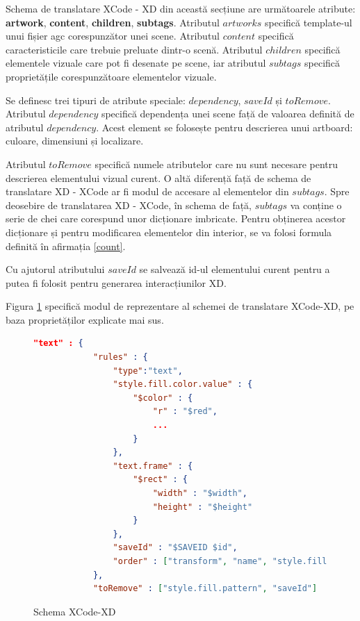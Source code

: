 Schema de translatare XCode - XD din această secțiune are următoarele atribute: \textbf{artwork}, \textbf{content}, \textbf{children}, \textbf{subtags}. Atributul $artworks$ specifică template-ul unui fișier agc corespunzător unei scene. Atributul $content$ specifică caracteristicile care trebuie preluate dintr-o scenă. Atributul $children$ specifică elementele vizuale care pot fi desenate pe scene, iar atributul $subtags$ specifică proprietățile corespunzătoare elementelor vizuale.

Se definesc trei tipuri de atribute speciale: $dependency$, $saveId$ și $toRemove$. Atributul $dependency$ specifică
dependența unei scene față de valoarea definită de atributul $dependency$. Acest element se folosește pentru descrierea unui artboard: culoare, dimensiuni și localizare.

Atributul $toRemove$ specifică numele atributelor care nu sunt necesare pentru descrierea elementului vizual curent.
O altă diferență față de schema de translatare XD - XCode ar fi modul de accesare al elementelor din $subtags$.
Spre deosebire de translatarea XD - XCode, în schema de față, $subtags$ va conține o serie de chei care corespund unor dicționare imbricate. Pentru obținerea acestor dicționare și pentru modificarea elementelor din interior, se va folosi formula definită în afirmația \ref{count}.

Cu ajutorul atributului $saveId$ se salvează id-ul elementului curent pentru a putea fi folosit pentru generarea interacțiunilor XD.

Figura \ref{fig:Schema2} specifică modul de reprezentare al schemei de translatare XCode-XD, pe baza proprietăților explicate mai sus.

\begin{figure}[!htbp]
\begin{lstlisting}[language=json,firstnumber=1]
 "text" : {
            "rules" : {
                "type":"text",
                "style.fill.color.value" : {
                    "$color" : {
                        "r" : "$red",
                        ...
                    }
                },
                "text.frame" : {
                    "$rect" : {
                        "width" : "$width",
                        "height" : "$height"
                    }
                },
                "saveId" : "$SAVEID $id",
                "order" : ["transform", "name", "style.fill.color.value", "style.font", "text.frame", "text.rawText", "meta.ux.rangedStyles", "text.paragraphs", "saveId"]
            },
            "toRemove" : ["style.fill.pattern", "saveId"] 
\end{lstlisting}
\caption{Schema XCode-XD} \label{fig:Schema2}
\end{figure}

